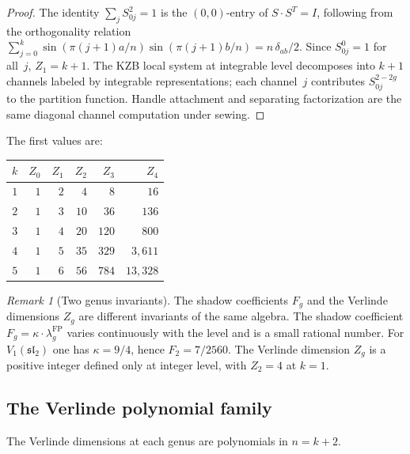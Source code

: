 \documentclass[11pt,reqno]{amsart}
\theoremstyle{definition}
\theoremstyle{remark}
\newtheorem{remark}[theorem]{Remark}
\providecommand{\fsl}{\mathfrak{sl}}
\providecommand{\FP}{\mathrm{FP}}
\numberwithin{equation}{section}
\begin{document}
\begin{proof}
  The identity $\sum_j S_{0j}^2 = 1$ is the $(0,0)$-entry of
  $S \cdot S^T = I$, following from the orthogonality relation
  $\sum_{j=0}^{k} \sin(\pi(j{+}1)a/n)
  \sin(\pi(j{+}1)b/n) = n\,\delta_{ab}/2$.
  Since $S_{0j}^0 = 1$ for all~$j$, $Z_1 = k + 1$.
  The KZB local system at integrable level decomposes
  into $k+1$ channels labeled by integrable representations; each
  channel~$j$ contributes $S_{0j}^{2-2g}$ to the partition function.
  Handle attachment and separating factorization are the same
  diagonal channel computation under sewing.
\end{proof}

The first values are:
\begin{center}
\renewcommand{\arraystretch}{1.3}
\begin{tabular}{@{} c r r r r r @{}}
\toprule
$k$ & $Z_0$ & $Z_1$ & $Z_2$ & $Z_3$ & $Z_4$ \\
\midrule
$1$ & $1$ & $2$ & $4$ & $8$ & $16$ \\
$2$ & $1$ & $3$ & $10$ & $36$ & $136$ \\
$3$ & $1$ & $4$ & $20$ & $120$ & $800$ \\
$4$ & $1$ & $5$ & $35$ & $329$ & $3{,}611$ \\
$5$ & $1$ & $6$ & $56$ & $784$ & $13{,}328$ \\
\bottomrule
\end{tabular}
\end{center}

\begin{remark}[Two genus invariants]\label{rem:Fg-vs-Zg}
  The shadow coefficients $F_g$ and the Verlinde dimensions $Z_g$
  are different invariants of the same algebra. The shadow
  coefficient $F_g = \kappa \cdot \lambda_g^{\FP}$
  varies continuously with the level and is a small rational
  number. For $V_1(\fsl_2)$ one has $\kappa=9/4$, hence
  $F_2 = 7/2560$. The Verlinde
  dimension $Z_g$ is a positive integer defined only at integer
  level, with $Z_2 = 4$ at $k = 1$.
\end{remark}

\subsection{The Verlinde polynomial family}

The Verlinde dimensions at each genus are polynomials in $n = k+2$.
\end{document}
